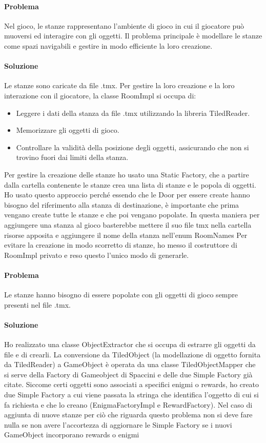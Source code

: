 \documentclass[a4paper,12pt]{report}
\begin{document}
\paragraph{Problema} %
Nel gioco, le stanze rappresentano l'ambiente di gioco in cui il giocatore può muoversi ed interagire con gli oggetti. Il problema principale è modellare le stanze come spazi navigabili e gestire in modo efficiente la loro creazione.
\paragraph{Soluzione} %
Le stanze sono caricate da file .tmx. Per gestire la loro creazione e la loro interazione con il giocatore, la classe RoomImpl si occupa di:
\begin{itemize}
    \item Leggere i dati della stanza da file .tmx utilizzando la libreria TiledReader.
    \item Memorizzare gli oggetti di gioco.
    \item Controllare la validità della posizione degli oggetti, assicurando che non si trovino fuori dai limiti della stanza.
\end{itemize}

Per gestire la creazione delle stanze ho usato una Static Factory, che a partire dalla cartella contenente le stanze crea una lista di stanze e le popola di oggetti.
Ho usato questo approccio perché essendo che le Door per essere create hanno bisogno del riferimento alla stanza di destinazione, è importante che prima vengano create tutte le stanze e che poi vengano popolate.
In questa maniera per aggiungere una stanza al gioco basterebbe mettere il suo file tmx nella cartella risorse apposita e aggiungere il nome della stanza nell'enum RoomNames
Per evitare la creazione in modo scorretto di stanze, ho messo il costruttore di RoomImpl privato e reso questo l'unico modo di generarle.

\paragraph{Problema} %
Le stanze hanno bisogno di essere popolate con gli oggetti di gioco sempre presenti nel file .tmx.
\paragraph{Soluzione} %
Ho realizzato una classe ObjectExtractor che si occupa di estrarre gli oggetti da file e di crearli.
La conversione da TiledObject (la modellazione di oggetto fornita da TiledReader) a GameObject è operata da una classe TiledObjectMapper che si serve della Factory di Gameobject di Spaccini e delle due Simple Factory già citate.
Siccome certi oggetti sono associati a specifici enigmi o rewards, ho creato due Simple Factory a cui viene passata la stringa che identifica l'oggetto di cui si fa richiesta e che lo creano (EnigmaFactoryImpl e RewardFactory).
Nel caso di aggiunta di nuove stanze per ciò che riguarda questo problema non si deve fare nulla se non avere l'accortezza di aggiornare le Simple Factory se i nuovi GameObject incorporano rewards o enigmi
\end{document}
